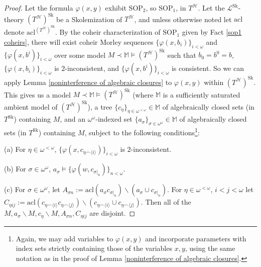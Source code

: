 \documentclass{amsart}
\theoremstyle{definition}
\theoremstyle{remark}
\numberwithin{equation}{section}
\begin{document}
\begin{proof}
    Let the formula $\varphi(x, y)$ exhibit $\mathrm{SOP}_{2}$, so $\mathrm{SOP}_{1}$, in $T^{\mathcal{H}}$. Let  the $\mathcal{L}^{\mathrm{Sk}}$-theory $(T^{\mathcal{H}})^{\mathrm{Sk}}$ be a Skolemization of $T^{\mathcal{H}}$, and unless otherwise noted let $\mathrm{acl}$ denote $\mathrm{acl}^{(T^{\mathcal{H}})^{\mathrm{Sk}}}$. By the coheir characterization of $\mathrm{SOP}_{1}$ given by Fact \ref{sop1 coheirs}, there will exist coheir Morley sequences $\{\varphi(x, b_{i})\}_{i < \omega}$ and $\{\varphi(x, b^{i})\}_{i < \omega}$ over some model $M \prec \mathbb{M} \models (T^{\mathcal{H}})^{\mathrm{Sk}}$ such that $b_0 = b^0 = b$, $\{\varphi(x, b_{i})\}_{i < \omega}$ is $2$-inconsistent, and $\{\varphi(x, b^{i})\}_{i < \omega}$ is consistent. So we can apply Lemma \ref{noninterference of algebraic closures} to $\varphi(x, y)$ within $(T^{\mathcal{H}})^{\mathrm{Sk}}$. This gives us a model $M \prec \mathbb{M} \models (T^{\mathcal{H}})^{\mathrm{Sk}}$ (where $\mathbb{M}$ is a sufficiently saturated ambient model of $(T^{\mathcal{H}})^{\mathrm{Sk}}$), a tree $\{c_{\eta}\}_{\eta \in \omega^{< \omega}} \in \mathbb{M}$ of algebraically closed sets (in $T^{\mathrm{Sk}}$) containing $M$, and an $\omega^{\omega}$-indexed set $\{a_{\sigma}\}_{\sigma \in \omega^{\omega}} \in \mathbb{M}$ of algebraically closed sets (in $T^{\mathrm{Sk}}$) containing $M$, subject to the following conditions\footnote{Again, we may add variables to $\varphi(x, y)$ and incorporate parameters with index sets strictly containing those of the variables $x, y$, using the same notation as in the proof of Lemma \ref{noninterference of algebraic closures}.}:

    (a) For $\eta \in \omega^{< \omega}$, $\{\varphi(x, c_{\eta \smallfrown \langle i \rangle})\}_{i < \omega}$ is $2$-inconsistent. 


    (b) For $\sigma \in \omega^{\omega}$,  $a_{\sigma} \models  \{\varphi(w, c_{\sigma|_{n}})\}_{n < \omega}$.

    (c) For $\sigma \in \omega^{\omega}$, let $A_{\sigma n}:=\mathrm{acl}(a_{\sigma}c_{\sigma|_{n}})\backslash(a_{\sigma} \cup c_{\sigma|_{n}})$. For $\eta \in \omega^{< \omega}$, $i < j < \omega$ let $C_{\eta ij}:= \mathrm{acl}(c_{\eta \smallfrown \langle i \rangle } c_{\eta \smallfrown \langle j \rangle }) \backslash (c_{\eta \smallfrown \langle i \rangle } \cup c_{\eta \smallfrown \langle j \rangle }) $. Then all of the $M, a_{\sigma} \backslash M,c_{\eta} \backslash M, A_{\sigma n}, C_{\eta ij}$ are disjoint.


\end{proof}
\end{document}
